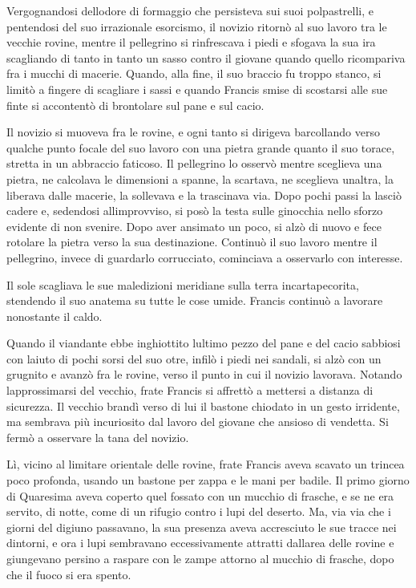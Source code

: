 Vergognandosi dell\textquotesingle odore di formaggio che persisteva sui
suoi polpastrelli, e pentendosi del suo irrazionale esorcismo, il
novizio ritornò al suo lavoro tra le vecchie rovine, mentre il
pellegrino si rinfrescava i piedi e sfogava la sua ira scagliando di
tanto in tanto un sasso contro il giovane quando quello ricompariva fra
i mucchi di macerie. Quando, alla fine, il suo braccio fu troppo stanco,
si limitò a fingere di scagliare i sassi e quando Francis smise di
scostarsi alle sue finte si accontentò di brontolare sul pane e sul
cacio.

Il novizio si muoveva fra le rovine, e ogni tanto si dirigeva
barcollando verso qualche punto focale del suo lavoro con una pietra
grande quanto il suo torace, stretta in un abbraccio faticoso. Il
pellegrino lo osservò mentre sceglieva una pietra, ne calcolava le
dimensioni a spanne, la scartava, ne sceglieva un\textquotesingle altra,
la liberava dalle macerie, la sollevava e la trascinava via. Dopo pochi
passi la lasciò cadere e, sedendosi all\textquotesingle improvviso, si
posò la testa sulle ginocchia nello sforzo evidente di non svenire. Dopo
aver ansimato un poco, si alzò di nuovo e fece rotolare la pietra verso
la sua destinazione. Continuò il suo lavoro mentre il pellegrino, invece
di guardarlo corrucciato, cominciava a osservarlo con interesse.

Il sole scagliava le sue maledizioni meridiane sulla terra
incartapecorita, stendendo il suo anatema su tutte le cose umide.
Francis continuò a lavorare nonostante il caldo.

Quando il viandante ebbe inghiottito l\textquotesingle ultimo pezzo del
pane e del cacio sabbiosi con l\textquotesingle aiuto di pochi sorsi del
suo otre, infilò i piedi nei sandali, si alzò con un grugnito e avanzò
fra le rovine, verso il punto in cui il novizio lavorava. Notando
l\textquotesingle approssimarsi del vecchio, frate Francis si affrettò a
mettersi a distanza di sicurezza. Il vecchio brandì verso di lui il
bastone chiodato in un gesto irridente, ma sembrava più incuriosito dal
lavoro del giovane che ansioso di vendetta. Si fermò a osservare la tana
del novizio.

Lì, vicino al limitare orientale delle rovine, frate Francis aveva
scavato un trincea poco profonda, usando un bastone per zappa e le mani
per badile. Il primo giorno di Quaresima aveva coperto quel fossato con
un mucchio di frasche, e se ne era servito, di notte, come di un rifugio
contro i lupi del deserto. Ma, via via che i giorni del digiuno
passavano, la sua presenza aveva accresciuto le sue tracce nei dintorni,
e ora i lupi sembravano eccessivamente attratti
dall\textquotesingle area delle rovine e giungevano persino a raspare
con le zampe attorno al mucchio di frasche, dopo che il fuoco si era
spento.

